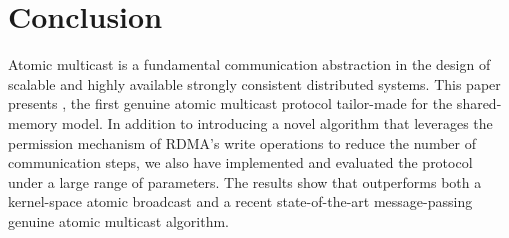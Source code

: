 \section{Conclusion}
\label{sec:conclusion}

Atomic multicast is a fundamental communication abstraction in the design of scalable and highly available strongly consistent distributed systems.
This paper presents \libname, the first genuine atomic multicast protocol tailor-made for the shared-memory model.
In addition to introducing a novel algorithm that leverages the permission mechanism of RDMA's write operations to reduce the number of communication steps, we also have implemented and evaluated the protocol under a large range of parameters.
The results show that \libname outperforms both a kernel-space atomic broadcast and a recent state-of-the-art message-passing genuine atomic multicast algorithm.


